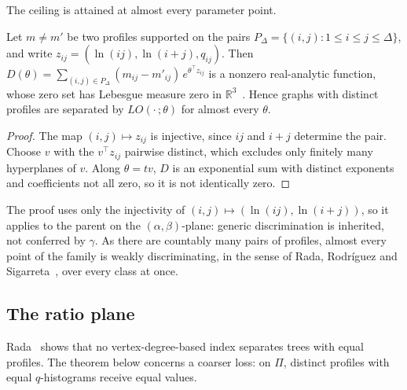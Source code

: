 The ceiling is attained at almost every parameter point.

  \begin{proposition}\label{prop:generic}
  Let $m \neq m'$ be two profiles supported on the pairs
  $P_{\Delta} = \{(i,j) : 1 \le i \le j \le \Delta\}$, and write
  $z_{ij} = (\ln(ij), \ln(i+j), q_{ij})$. Then
  $D(\theta) = \sum_{(i,j) \in P_{\Delta}} (m_{ij} - m'_{ij})\,
  e^{\theta^{\top} z_{ij}}$ is a nonzero real-analytic function, whose zero
  set has Lebesgue measure zero in $\mathbb{R}^3$~\cite{Mityagin2020}.
  Hence graphs with distinct profiles are separated by
  $LO(\cdot\,;\theta)$ for almost every $\theta$.
  \end{proposition}

  \begin{proof}
  The map $(i,j) \mapsto z_{ij}$ is injective, since $ij$ and $i+j$
  determine the pair. Choose $v$ with the $v^{\top} z_{ij}$ pairwise
  distinct, which excludes only finitely many hyperplanes of $v$. Along $\theta = tv$, $D$ is an exponential sum with distinct
  exponents and coefficients not all zero, so it is not identically zero.
  \end{proof}

  The proof uses only the injectivity of
  $(i,j) \mapsto (\ln(ij), \ln(i+j))$, so it applies to the parent on the
  $(\alpha,\beta)$-plane: generic discrimination is inherited, not conferred
  by $\gamma$. As there are countably many pairs of profiles, almost every
  point of the family is weakly discriminating, in the sense of Rada,
  Rodr\'iguez and Sigarreta~\cite{RadaRodriguezSigarreta2022Weak}, over
  every class at once.

\subsection{The ratio plane}\label{sec:ratioplane}

  Rada~\cite{Rada2026LinearVDB} shows that no vertex-degree-based index
  separates trees with equal profiles. The theorem below concerns a
  coarser loss: on $\Pi$, distinct profiles with equal $q$-histograms
  receive equal values.

